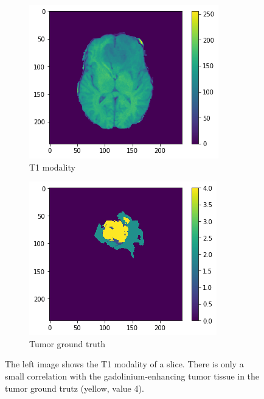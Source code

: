\begin{figure}[H]
    \centering
    \begin{subfigure}{.5\textwidth}
        \centering
        \includegraphics[width=\linewidth]{chapters/04_segmentation/images/medical_background/t1.png}
        \caption{T1 modality}
    \end{subfigure}%
    \begin{subfigure}{.5\textwidth}
        \centering
        \includegraphics[width=\linewidth]{chapters/04_segmentation/images/medical_background/tumor.png}
        \caption{Tumor ground truth}
    \end{subfigure}
    \caption{The left image shows the T1 modality of a slice. There is only a small correlation with the gadolinium-enhancing tumor tissue in the tumor ground trutz (yellow, value 4).}
    \label{medical_background_t1}
\end{figure}



